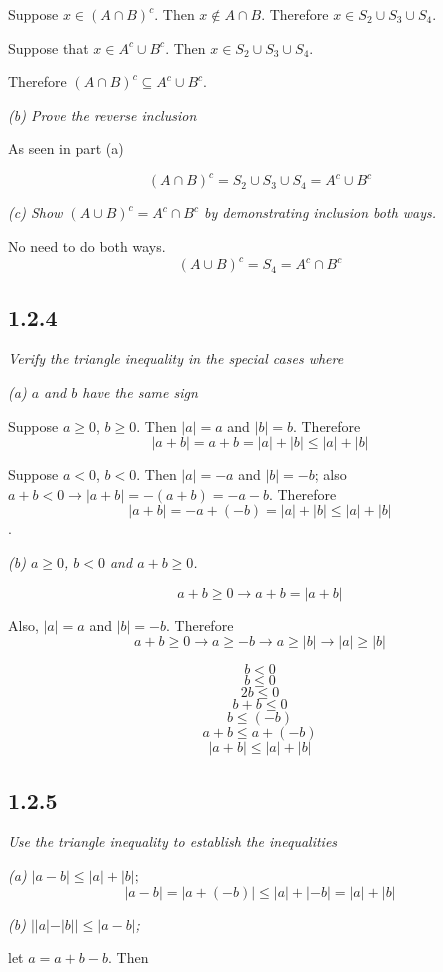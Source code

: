 \documentclass[11pt,oneside,titlepage]{book}
\begin{document}
Suppose $x \in (A \cap B)^c$. Then $x \notin A \cap B$. Therefore
$x \in S_2 \cup S_3 \cup S_4$.

Suppose that $x \in A^c \cup B^c$. Then $x \in S_2 \cup S_3 \cup S_4$.

Therefore $ (A \cap B)^c \subseteq A^c \cup B^c$.

\textit{(b) Prove the reverse inclusion}


As seen in part (a)

$$(A \cap B)^c = S_2 \cup S_3 \cup S_4 = A^c \cup B^c$$

\textit{(c) Show $(A \cup B)^c = A^c \cap B^c$ by demonstrating inclusion both
  ways.}

No need to do both ways.
$$(A \cup B)^c = S_4 = A^c \cap B^c$$


\subsection*{1.2.4}
\textit{Verify the triangle inequality in the special cases where }

\textit{(a) $a$ and $b$ have the same sign}

Suppose $a \geq 0$, $b \geq 0$. Then $|a| = a$ and $|b| = b$. Therefore
$$|a + b| = a + b = |a| + |b| \leq  |a| + |b|$$

Suppose $a < 0$, $b < 0$. Then $|a| = -a$ and $|b| = -b$; also $a + b < 0 \to
|a + b| = -(a + b) = -a - b$. Therefore 
$$|a + b| = -a + (-b) = |a| + |b| \leq  |a| + |b|$$.

\textit{(b) $a \geq 0$, $b < 0$ and $a + b \geq 0$.}

$$a + b \geq 0 \to a + b = |a + b|$$

Also, $|a| = a$ and $|b| = -b$. Therefore
$$a + b \geq 0 \to a \geq -b \to a \geq |b| \to |a| \geq |b|$$

$$ b < 0$$
$$ b \leq 0$$
$$ 2b \leq 0$$
$$ b + b \leq 0$$
$$ b \leq (-b)$$
$$a + b \leq a + (-b)$$
$$|a + b| \leq |a| + |b|$$

\subsection*{1.2.5}
\textit{Use the triangle inequality to establish the inequalities}

\textit{(a) $|a - b| \leq |a| + |b|;$}
$$|a - b| = |a + (-b)| \leq |a| + |-b| = |a| + |b|$$

\textit{(b) $||a| - |b|| \leq |a - b|$;}

let $a = a + b - b$. Then
\end{document}
